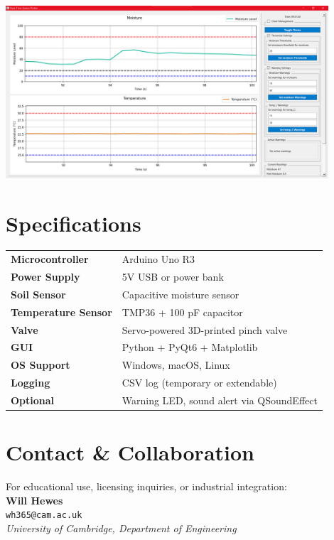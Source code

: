\documentclass[a4paper,11pt]{article}
\begin{document}
\vspace{1em}

\begin{center}
    \includegraphics[width=0.9\textwidth]{Images/3 - Threshold Setting.png}
\end{center}

\vspace{1em}

\section*{Specifications}

\begin{center}
\begin{tabularx}{0.85\textwidth}{@{} >{\raggedright\arraybackslash}p{4cm} X @{}}
\textbf{Microcontroller} & Arduino Uno R3 \\
\textbf{Power Supply} & 5V USB or power bank \\
\textbf{Soil Sensor} & Capacitive moisture sensor \\
\textbf{Temperature Sensor} & TMP36 + 100 pF capacitor \\
\textbf{Valve} & Servo-powered 3D-printed pinch valve \\
\textbf{GUI} & Python + PyQt6 + Matplotlib \\
\textbf{OS Support} & Windows, macOS, Linux \\
\textbf{Logging} & CSV log (temporary or extendable) \\
\textbf{Optional} & Warning LED, sound alert via QSoundEffect \\
\end{tabularx}
\end{center}

\section*{Contact \& Collaboration}
For educational use, licensing inquiries, or industrial integration:\\

\noindent
\textbf{Will Hewes} \\
\texttt{wh365@cam.ac.uk} \\
\textit{University of Cambridge, Department of Engineering}
\end{document}
